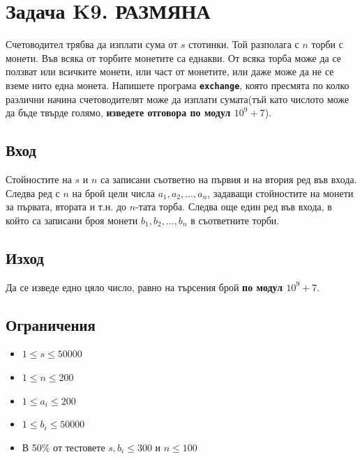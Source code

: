 \documentclass[12pt]{article}
\begin{document}
	
\section{Задача K9. РАЗМЯНА}

Счетоводител трябва да изплати сума от $s$ стотинки. Той разполага с $n$ торби с монети. Във всяка от торбите монетите са еднакви. От всяка торба може да се ползват или всичките монети, или част от монетите, или даже може да не се вземе нито една монета. Напишете програма \textbf{\texttt{exchange}}, която пресмята по колко различни начина счетоводителят може да изплати сумата(тъй като числото може да бъде твърде голямо, \textbf{изведете отговора по модул $10^{9} + 7$}).

\subsection{Вход}
Стойностите на $s$ и $n$ са записани съответно на първия и на втория ред във входа. Следва ред с $n$ на брой цели числа $a_1, a_2, \ldots, a_n$, задаващи стойностите на монети за първата, втората и т.н. до $n$-тата торба. Следва още един ред във входа, в който са записани броя монети $b_1, b_2, \ldots, b_n$ в съответните торби.

\subsection{Изход}
Да се изведе едно цяло число, равно на търсения брой \textbf{по модул $10^{9} + 7$}.

\subsection{Ограничения}
\vspace{0.1em}
\begin{itemize}[label=$\clubsuit$]
	\item $1 \leq s \leq 50000$
	\item $1 \leq n \leq 200$
	\item $1 \leq a_i \leq 200$
	\item $1 \leq b_i \leq 50000$
	\item В 50\% от тестовете $s, b_i \leq 300$ и $n \leq 100$
\end{itemize}
\end{document}
